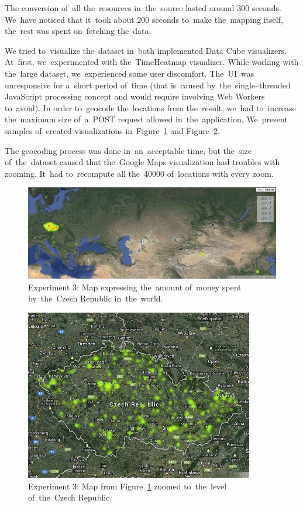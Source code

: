 The conversion of~all the~resources in~the~source lasted around 300 seconds. We~have noticed that it~took about 200 seconds to~make the~mapping itself, the~rest 
was spent on~fetching the~data.

We tried to~visualize the~dataset in~both implemented Data Cube visualizers. At~first, we~experimented 
with the~TimeHeatmap visualizer. While working with the~large dataset, we~experienced some user discomfort. The~UI~was unresponsive for a~short period of~time
(that is~caused by~the~single--threaded JavaScript processing concept and would require
involving Web Workers to~avoid). 
In order to~geocode the~locations from the~result, we~had to~increase the~maximum size of~a~POST request allowed in~the~application. We~present samples of~created visualizations in~Figure~\ref{fig:contracts-map-world} and 
Figure~\ref{fig:contracts-map-zoomed}.

The geocoding process was done in~an~acceptable time, but the~size of~the~dataset caused that the~Google Maps visualization had troubles with zooming. It~had to~recompute all the~40000 of~locations with every zoom.

\begin{figure}
  \centering
  \includegraphics[width=140mm]{img/contracts-map-world.png}
  \caption{Experiment 3: Map expressing the~amount of~money spent by~the~Czech Republic in~the~world.}
  \label{fig:contracts-map-world}
\end{figure}

\begin{figure}
  \centering
  \includegraphics[width=100mm]{img/contracts-map-zoomed.png}
  \caption{Experiment 3: Map from Figure~\ref{fig:contracts-map-world} zoomed to~the~level of~the~Czech Republic.}
  \label{fig:contracts-map-zoomed}
\end{figure}

